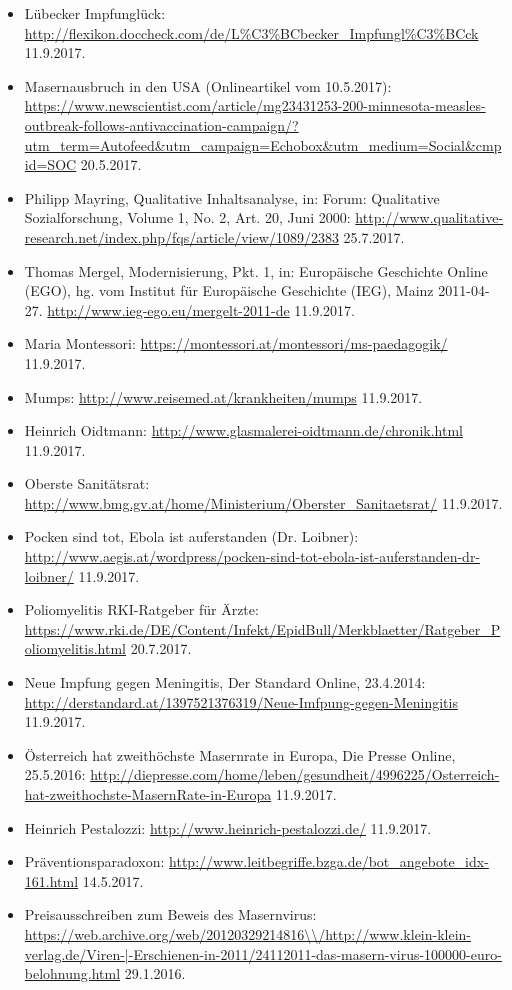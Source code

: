\documentclass[
    a4paper,
    12pt,
    hyphens,
    chapterprefix=true,
    headheight=33pt,
    footheight=29pt,
    headings=optiontohead, %
]{scrartcl}
\begin{document}
{\begin{itemize}
\item{Lübecker Impfunglück: \url{http://flexikon.doccheck.com/de/L\%C3\%BCbecker_Impfungl\%C3\%BCck} 11.9.2017.}
\item{Masernausbruch in den USA (Onlineartikel vom 10.5.2017): \url{https://www.newscientist.com/article/mg23431253-200-minnesota-measles-outbreak-follows-antivaccination-campaign/?utm_term=Autofeed&utm_campaign=Echobox&utm_medium=Social&cmpid=SOC} 20.5.2017.}
\item{Philipp Mayring, Qualitative Inhaltsanalyse, in: Forum: Qualitative Sozialforschung, Volume 1, No. 2, Art. 20, Juni 2000: \url{http://www.qualitative-research.net/index.php/fqs/article/view/1089/2383} 25.7.2017.}
\item{Thomas Mergel, Modernisierung, Pkt. 1, in: Europäische Geschichte Online (EGO), hg. vom Institut für Europäische Geschichte (IEG), Mainz 2011-04-27. \url{http://www.ieg-ego.eu/mergelt-2011-de} 11.9.2017.}
\item{Maria Montessori: \url{https://montessori.at/montessori/ms-paedagogik/} 11.9.2017.}
\item{Mumps: \url{http://www.reisemed.at/krankheiten/mumps} 11.9.2017.}
\item{Heinrich Oidtmann: \url{http://www.glasmalerei-oidtmann.de/chronik.html} 11.9.2017.}
\item{Oberste Sanitätsrat: \url{http://www.bmg.gv.at/home/Ministerium/Oberster_Sanitaetsrat/} 11.9.2017.}
\item{Pocken sind tot, Ebola ist auferstanden (Dr. Loibner): \url{http://www.aegis.at/wordpress/pocken-sind-tot-ebola-ist-auferstanden-dr-loibner/} 11.9.2017.}
\item{Poliomyelitis RKI-Ratgeber für Ärzte: \url{https://www.rki.de/DE/Content/Infekt/EpidBull/Merkblaetter/Ratgeber_Poliomyelitis.html} 20.7.2017.}
\item{Neue Impfung gegen Meningitis, Der Standard Online, 23.4.2014: \url{http://derstandard.at/1397521376319/Neue-Imfpung-gegen-Meningitis} 11.9.2017.}
\item{Österreich hat zweithöchste Masernrate in Europa, Die Presse Online, 25.5.2016: \url{http://diepresse.com/home/leben/gesundheit/4996225/Osterreich-hat-zweithochste-MasernRate-in-Europa} 11.9.2017.}
\item{Heinrich Pestalozzi: \url{http://www.heinrich-pestalozzi.de/} 11.9.2017.}
\item{Präventionsparadoxon: \url{http://www.leitbegriffe.bzga.de/bot_angebote_idx-161.html} 14.5.2017.}
\item{Preisausschreiben zum Beweis des Masernvirus: \url{https://web.archive.org/web/20120329214816\\/http://www.klein-klein-verlag.de/Viren-|-Erschienen-in-2011/24112011-das-masern-virus-100000-euro-belohnung.html} 29.1.2016.}

\end{itemize}}
\end{document}
